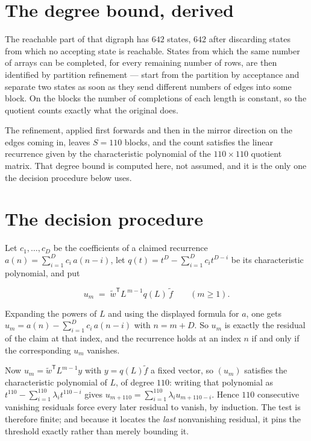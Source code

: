 \documentclass[11pt]{article}
\theoremstyle{definition}
\begin{document}
\section{The degree bound, derived}

The reachable part of that digraph has $642$ states, $642$ after discarding states from which no accepting state is reachable. States from which the same number of arrays can be completed, for every remaining number of rows, are then identified by partition refinement --- start from the partition by acceptance and separate two states as soon as they send different numbers of edges into some block. On the blocks the number of completions of each length is constant, so the quotient counts exactly what the original does.

The refinement, applied first forwards and then in the mirror direction on the edges coming in, leaves $S = 110$ blocks, and the count satisfies the linear recurrence given by the characteristic polynomial of the $110 \times 110$ quotient matrix. That degree bound is computed here, not assumed, and it is the only one the decision procedure below uses.

\section{The decision procedure}

Let $c_1,\dots,c_D$ be the coefficients of a claimed recurrence $a(n) = \sum_{i=1}^{D} c_i\,a(n-i)$, let $q(t) = t^{D} - \sum_{i=1}^{D} c_i t^{D-i}$ be its characteristic polynomial, and put

\[u_m \;=\; \tilde w^{\mathsf T} L^{\,m-1} q(L)\,\tilde f \qquad (m \ge 1).\]

Expanding the powers of $L$ and using the displayed formula for $a$, one gets $u_m = a(n) - \sum_{i=1}^{D} c_i\,a(n-i)$ with $n = m + D$. So $u_m$ is exactly the residual of the claim at that index, and the recurrence holds at an index $n$ if and only if the corresponding $u_m$ vanishes.

Now $u_m = \tilde w^{\mathsf T} L^{m-1} y$ with $y = q(L)\tilde f$ a fixed vector, so $(u_m)$ satisfies the characteristic polynomial of $L$, of degree $110$: writing that polynomial as $t^{110} - \sum_{i=1}^{110} \lambda_i t^{110-i}$ gives $u_{m+110} = \sum_{i=1}^{110} \lambda_i u_{m+110-i}$. Hence $110$ consecutive vanishing residuals force every later residual to vanish, by induction. The test is therefore finite; and because it locates the {\itshape last} nonvanishing residual, it pins the threshold exactly rather than merely bounding it.
\end{document}
